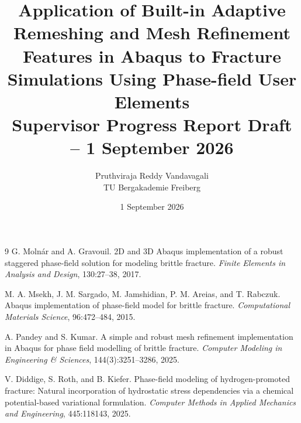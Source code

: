 \documentclass[11pt,a4paper,oneside]{report}
\title{Application of Built-in Adaptive Remeshing and Mesh Refinement Features in Abaqus to Fracture Simulations Using Phase-field User Elements\\[0.7em]\large Supervisor Progress Report Draft -- 1 September 2026}
\author{Pruthviraja Reddy Vandavagali\\TU Bergakademie Freiberg}
\date{1 September 2026}
\begin{document}
\maketitle
\tableofcontents
\clearpage










\begin{thebibliography}{9}
G. Moln\'ar and A. Gravouil.
\newblock 2D and 3D Abaqus implementation of a robust staggered phase-field solution for modeling brittle fracture.
\newblock \emph{Finite Elements in Analysis and Design}, 130:27--38, 2017.

M. A. Msekh, J. M. Sargado, M. Jamshidian, P. M. Areias, and T. Rabczuk.
\newblock Abaqus implementation of phase-field model for brittle fracture.
\newblock \emph{Computational Materials Science}, 96:472--484, 2015.

A. Pandey and S. Kumar.
\newblock A simple and robust mesh refinement implementation in Abaqus for phase field modelling of brittle fracture.
\newblock \emph{Computer Modeling in Engineering \& Sciences}, 144(3):3251--3286, 2025.

V. Diddige, S. Roth, and B. Kiefer.
\newblock Phase-field modeling of hydrogen-promoted fracture: Natural incorporation of hydrostatic stress dependencies via a chemical potential-based variational formulation.
\newblock \emph{Computer Methods in Applied Mechanics and Engineering}, 445:118143, 2025.
\end{thebibliography}
\end{document}
